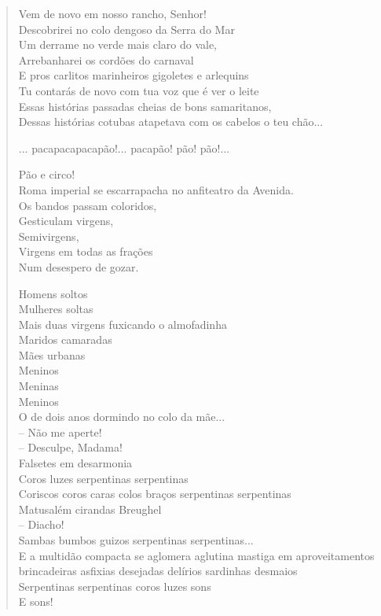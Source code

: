 \begin{verse}
Vem de novo em nosso rancho, Senhor!\\
Descobrirei no colo dengoso da Serra do Mar\\
Um derrame no verde mais claro do vale,\\
Arrebanharei os cordões do carnaval\\
E pros carlitos marinheiros gigoletes e arlequins\\
Tu contarás de novo com tua voz que é ver o leite\\
Essas histórias passadas cheias de bons samaritanos,\\
Dessas histórias cotubas atapetava com os cabelos o teu chão...

... pacapacapacapão!... pacapão! pão! pão!...

Pão e circo!\\
Roma imperial se escarrapacha no anfiteatro da Avenida.\\
Os bandos passam coloridos,\\
Gesticulam virgens,\\
Semivirgens,\\
Virgens em todas as frações\\
Num desespero de gozar.

Homens soltos\\
Mulheres soltas\\
Mais duas virgens fuxicando o almofadinha\\
Maridos camaradas\\
Mães urbanas\\
Meninos\\
Meninas\\
Meninos\\
O de dois anos dormindo no colo da mãe...\\
-- Não me aperte!\\
\quad{}-- Desculpe, Madama!\\
Falsetes em desarmonia\\
Coros luzes serpentinas serpentinas\\
Coriscos coros caras colos braços serpentinas serpentinas\\
Matusalém cirandas Breughel\\
\quad\quad\quad-- Diacho!\\
Sambas bumbos guizos serpentinas serpentinas...\\
E a multidão compacta se aglomera aglutina mastiga em aproveitamentos
brincadeiras asfixias desejadas delírios sardinhas desmaios\\
Serpentinas serpentinas coros luzes sons\\
E sons!\\


\end{verse}
